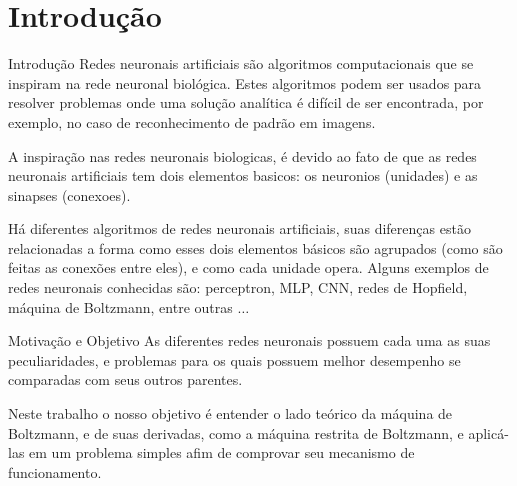 \section{Introdução}%

\begin{frame}{Introdução}%
  \justifying%
  Redes neuronais artificiais são algoritmos computacionais que se inspiram na rede neuronal biológica.
  Estes algoritmos podem ser usados para resolver problemas onde uma solução analítica é difícil de ser encontrada, por exemplo, no caso de reconhecimento de padrão em imagens.

  A inspiração nas redes neuronais biologicas, é devido ao fato de que as redes neuronais artificiais tem dois elementos basicos: os neuronios (unidades) e as sinapses (conexoes).

  Há diferentes algoritmos de redes neuronais artificiais, suas diferenças estão relacionadas a forma como esses dois elementos básicos são agrupados (como são feitas as conexões entre eles), e como cada unidade opera. Alguns exemplos de redes neuronais conhecidas são: perceptron, MLP, CNN, redes de Hopfield, máquina de Boltzmann, entre outras $\dots$
\end{frame}

\begin{frame}{Motivação e Objetivo}%
  \justifying%
  As diferentes redes neuronais possuem cada uma as suas peculiaridades, e problemas para os quais possuem melhor desempenho se comparadas com seus outros parentes.

  Neste trabalho o nosso objetivo é entender o lado teórico da máquina de Boltzmann, e de suas derivadas, como a máquina restrita de Boltzmann, e aplicá-las em um problema simples afim de comprovar seu mecanismo de funcionamento.
\end{frame}

